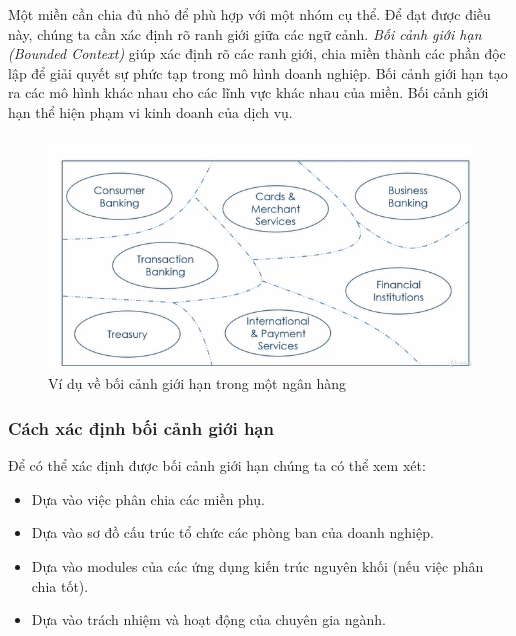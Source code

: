 Một miền cần chia đủ nhỏ để phù hợp với một nhóm cụ thể. Để đạt được điều này, chúng ta cần xác định rõ ranh giới giữa các ngữ cảnh. \emph{Bối cảnh giới hạn (Bounded Context)} giúp xác định rõ các ranh giới, chia miền thành các phần độc lập để giải quyết sự phức tạp trong mô hình doanh nghiệp. Bối cảnh giới hạn tạo ra các mô hình khác nhau cho các lĩnh vực khác nhau của miền. Bối cảnh giới hạn thể hiện phạm vi kinh doanh của dịch vụ.

\begin{figure}[H]

\centering

\includegraphics[scale = 1]{pictures/boi_canh_gioi_han/main.png}

\caption{Ví dụ về bối cảnh giới hạn trong một ngân hàng}

\end{figure}

\subsubsection{Cách xác định bối cảnh giới hạn}

Để có thể xác định được bối cảnh giới hạn chúng ta có thể xem xét:

\begin{itemize}

\item Dựa vào việc phân chia các miền phụ.

\item Dựa vào sơ đồ cấu trúc tổ chức các phòng ban của doanh nghiệp.

\item Dựa vào modules của các ứng dụng kiến trúc nguyên khối (nếu việc phân chia tốt).

\item Dựa vào trách nhiệm và hoạt động của chuyên gia ngành.

\end{itemize}

